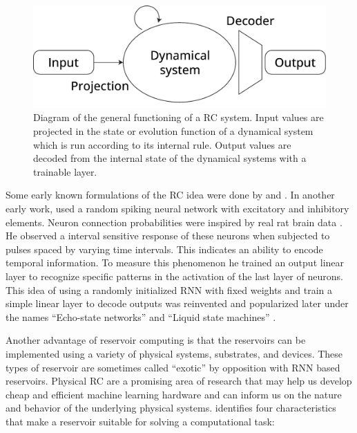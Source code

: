 \begin{figure}[htbp]
  \centering
  \includegraphics[width=.8\linewidth]{figures/reservoir_schema}
  \caption{Diagram of the general functioning of a \ac{RC} system. Input values
    are projected in the state or evolution function of a dynamical system which
    is run according to its internal rule. Output values are decoded from the
    internal state of the dynamical systems with a trainable layer.}
  \label{fig:reservoir_diagram}
\end{figure}

Some early known formulations of the \ac{RC} idea were done by
\textcite{kirbyContextDynamicsNeural1991} and
\textcite{schomakerNeuralNetworkModels1990,
  schomakerSimulationRecognitionHandwriting1991,
  schomakerNeuralOscillatornetworkModel1992}. In another early work,
\textcite{buonomanoTemporalInformationTransformed1995} used a random spiking
neural network with excitatory and inhibitory elements. Neuron connection
probabilities were inspired by real rat brain data
\parencite{masonSynapticTransmissionIndividual1991}. He observed a interval
sensitive response of these neurons when subjected to pulses spaced by varying
time intervals. This indicates an ability to encode temporal information. To
measure this phenomenon he trained an output linear layer to recognize specific
patterns in the activation of the last layer of neurons. This idea of using a
randomly initialized \ac{RNN} with fixed weights and train a simple linear layer
to decode outputs was reinvented and popularized later under the names
``Echo-state networks'' \parencite{jaegerEchoStateApproach2001} and ``Liquid
state machines'' \parencite{maassRealTimeComputingStable2002}.

Another advantage of reservoir computing is that the reservoirs can be
implemented using a variety of physical systems, substrates, and devices. These
types of reservoir are sometimes called ``exotic''
\parencite{lukoseviciusReservoirComputingApproaches2009} by opposition with
\ac{RNN} based reservoirs. Physical \ac{RC} are a promising area of research
that may help us develop cheap and efficient machine learning hardware and can
inform us on the nature and behavior of the underlying physical systems.
\textcite{tanakaRecentAdvancesPhysical2019} identifies four characteristics that
make a reservoir suitable for solving a computational task:

